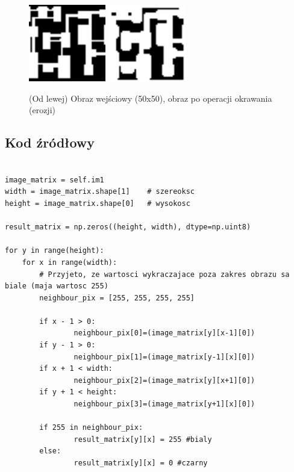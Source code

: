 \documentclass[final,a4paper,openany,12pt]{mwbk}
\begin{document}
\begin{figure}[H]
	\begin{center}
		\includegraphics[width=0.3\textwidth]{2/2Bin_E_Original}
		\includegraphics[width=0.3\textwidth]{2/2Bin_E_Result}
	\end{center}
	\caption{(Od lewej) Obraz wejściowy (50x50), obraz po operacji okrawania (erozji) }
\end{figure}


\subsection*{Kod źródłowy}

\begin{lstlisting}[caption= Operacja okrawania (erozji) na obrazie binarnym]

image_matrix = self.im1
width = image_matrix.shape[1]    # szereoksc
height = image_matrix.shape[0]   # wysokosc

result_matrix = np.zeros((height, width), dtype=np.uint8)

for y in range(height):
    for x in range(width):  
        # Przyjeto, ze wartosci wykraczajace poza zakres obrazu sa biale (maja wartosc 255)
        neighbour_pix = [255, 255, 255, 255]

        if x - 1 > 0:
                neighbour_pix[0]=(image_matrix[y][x-1][0])
        if y - 1 > 0:
                neighbour_pix[1]=(image_matrix[y-1][x][0])
        if x + 1 < width:
                neighbour_pix[2]=(image_matrix[y][x+1][0])
        if y + 1 < height:
                neighbour_pix[3]=(image_matrix[y+1][x][0])

        if 255 in neighbour_pix:
                result_matrix[y][x] = 255 #bialy
        else:
                result_matrix[y][x] = 0 #czarny   

\end{lstlisting}
\end{document}
